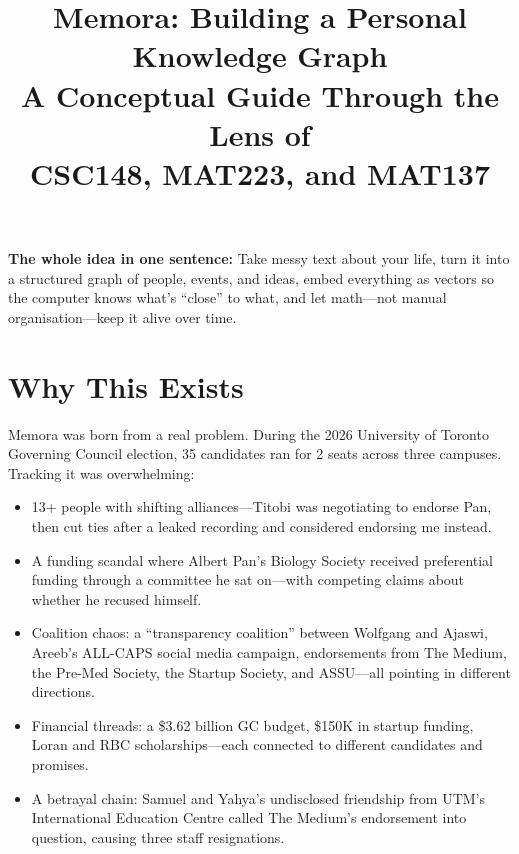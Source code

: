 \documentclass[11pt, letterpaper]{article}
\title{\textbf{Memora: Building a Personal Knowledge Graph} \\[4pt]
\large\color{gray} A Conceptual Guide Through the Lens of\\CSC148, MAT223, and MAT137}
\author{}
\date{}
\begin{document}
\maketitle
\thispagestyle{empty}

\vspace{-0.5cm}

\begin{keyidea}
\textbf{The whole idea in one sentence:} Take messy text about your life, turn it into a structured graph of people, events, and ideas, embed everything as vectors so the computer knows what's ``close'' to what, and let math---not manual organisation---keep it alive over time.
\end{keyidea}

\tableofcontents
\newpage

\section{Why This Exists}

Memora was born from a real problem. During the 2026 University of Toronto Governing Council election, 35 candidates ran for 2 seats across three campuses. Tracking it was overwhelming:

\begin{itemize}[itemsep=2pt]
    \item 13+ people with shifting alliances---Titobi was negotiating to endorse Pan, then cut ties after a leaked recording and considered endorsing me instead.
    \item A funding scandal where Albert Pan's Biology Society received preferential funding through a committee he sat on---with competing claims about whether he recused himself.
    \item Coalition chaos: a ``transparency coalition'' between Wolfgang and Ajaswi, Areeb's ALL-CAPS social media campaign, endorsements from The Medium, the Pre-Med Society, the Startup Society, and ASSU---all pointing in different directions.
    \item Financial threads: a \$3.62 billion GC budget, \$150K in startup funding, Loran and RBC scholarships---each connected to different candidates and promises.
    \item A betrayal chain: Samuel and Yahya's undisclosed friendship from UTM's International Education Centre called The Medium's endorsement into question, causing three staff resignations.
\end{itemize}
\end{document}
